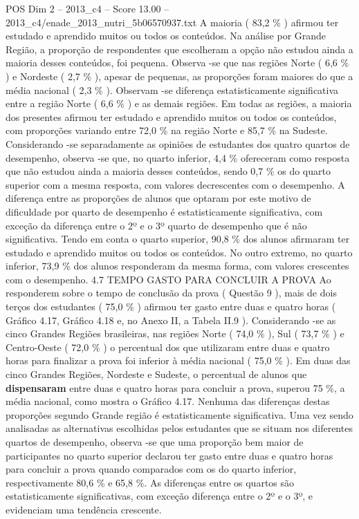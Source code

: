 \begin{textsample}{POS Dim 2 – 2013\_c4 – Score 13.00 – 2013\_c4/enade\_2013\_nutri\_5b06570937.txt}
A maioria ( 83,2 \% ) afirmou ter estudado e aprendido muitos ou todos os conteúdos.
Na análise por Grande Região, a proporção de respondentes que escolheram a opção não estudou ainda a maioria desses conteúdos, foi pequena.
Observa -se que nas regiões Norte ( 6,6 \% ) e Nordeste ( 2,7 \% ), apesar de pequenas, as proporções foram maiores do que a média nacional ( 2,3 \% ).
Observam -se diferença estatisticamente significativa entre a região Norte ( 6,6 \% ) e as demais regiões.
Em todas as regiões, a maioria dos presentes afirmou ter estudado e aprendido muitos ou todos os conteúdos, com proporções variando entre 72,0 \% na região Norte e 85,7 \% na Sudeste.
Considerando -se separadamente as opiniões de estudantes dos quatro quartos de desempenho, observa -se que, no quarto inferior, 4,4 \% ofereceram como resposta que não estudou ainda a maioria desses conteúdos, sendo 0,7 \% os do quarto superior com a mesma resposta, com valores decrescentes com o desempenho.
A diferença entre as proporções de alunos que optaram por este motivo de dificuldade por quarto de desempenho é estatisticamente significativa, com exceção da diferença entre o 2º e o 3º quarto de desempenho que é não significativa.
Tendo em conta o quarto superior, 90,8 \% dos alunos afirmaram ter estudado e aprendido muitos ou todos os conteúdos.
No outro extremo, no quarto inferior, 73,9 \% dos alunos responderam da mesma forma, com valores crescentes com o desempenho. 4.7 TEMPO GASTO PARA CONCLUIR A PROVA Ao responderem sobre o tempo de conclusão da prova ( Questão 9 ), mais de dois terços dos estudantes ( 75,0 \% ) afirmou ter gasto entre duas e quatro horas ( Gráfico 4.17, Gráfico 4.18 e, no Anexo II, a Tabela II.9 ).
Considerando -se as cinco Grandes Regiões brasileiras, nas regiões Norte ( 74,0 \% ), Sul ( 73,7 \% ) e Centro-Oeste ( 72,0 \% ) o percentual dos que utilizaram entre duas e quatro horas para finalizar a prova foi inferior à média nacional ( 75,0 \% ).
Em duas das cinco Grandes Regiões, Nordeste e Sudeste, o percentual de alunos que \textbf{dispensaram} entre duas e quatro horas para concluir a prova, superou 75 \%, a média nacional, como mostra o Gráfico 4.17.
Nenhuma das diferenças destas proporções segundo Grande região é estatisticamente significativa.
Uma vez sendo analisadas as alternativas escolhidas pelos estudantes que se situam nos diferentes quartos de desempenho, observa -se que uma proporção bem maior de participantes no quarto superior declarou ter gasto entre duas e quatro horas para concluir a prova quando comparados com os do quarto inferior, respectivamente 80,6 \% e 65,8 \%.
As diferenças entre os quartos são estatisticamente significativas, com exceção diferença entre o 2º e o 3º, e evidenciam uma tendência crescente.

\end{textsample}
